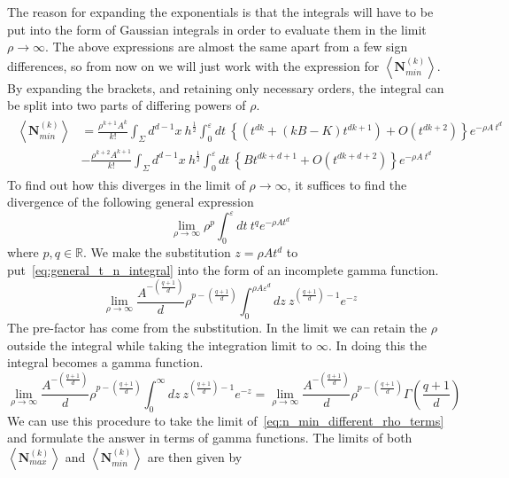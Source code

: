 \documentclass[12pt]{article}
\newcommand{\be}{\begin{equation}}
\newcommand{\ee}{\end{equation}}
\begin{document}
The reason for expanding the exponentials is that the integrals will have to be put into the form of Gaussian integrals in order to evaluate them in the limit $\rho\rightarrow\infty$. The above expressions are almost the same apart from a few sign differences, so from now on we will just work with the expression for $\left\langle \textbf{N}_{min}^{ (k)}\right\rangle$. By expanding the brackets, and retaining only necessary orders, the integral can be split into two parts of differing powers of $\rho$.
\begin{gather}\label{eq:n_min_different_rho_terms}
\begin{aligned}
\left\langle \textbf{N}_{min}^{ (k)}\right\rangle & = \frac{\rho^{k+1}A^k}{k!}\int_{\Sigma}d^{d-1}x\: h^{\frac{1}{2}}\int_{0}^{\varepsilon}dt\:
\left\lbrace \left ( t^{dk} + \left (kB-K \right)t^{dk+1}\right) + O\left (t^{dk+2}\right) \right\rbrace e^{-\rho A\: t^d}
 \\
 & - \frac{\rho^{k+2}A^{k+1}}{k!}\int_{\Sigma}d^{d-1}x\: h^{\frac{1}{2}}\int_{0}^{\varepsilon}dt\:
\left\lbrace Bt^{dk+d+1} + O\left (t^{dk+d+2}\right) \right\rbrace e^{-\rho A\: t^d}
\end{aligned}
\end{gather}
To find out how this diverges in the limit of $\rho \rightarrow\infty$, it suffices to find the divergence of the following general expression
\be\label{eq:general_t_n_integral}
\lim_{\rho\rightarrow\infty}\rho^{p}\int_{0}^{\varepsilon}dt\
t^{q}e^{-\rho At^{d}}
\ee
where $p,q \in \mathbb{R}$. We make the substitution $z=\rho At^{d}$ to put~\eqref{eq:general_t_n_integral} into the form of an incomplete gamma function.
\be\label{eq:incomplete_gamma_function}
\lim_{\rho\rightarrow\infty}\frac{A^{-\left (\frac{q+1}{d} \right)}}{d}\rho^{p-\left (\frac{q+1}{d} \right)}\int_{0}^{\rho A \varepsilon^d}dz\
z^{\left (\frac{q+1}{d} \right)-1}e^{-z}
\ee
The pre-factor has come from the substitution. In the limit we can retain the $\rho$ outside the integral while taking the integration limit to $\infty$. In doing this the integral becomes a gamma function.
\be\label{eq:gamma_function}
\lim_{\rho\rightarrow\infty}\frac{A^{-\left (\frac{q+1}{d} \right)}}{d}\rho^{p-\left (\frac{q+1}{d} \right)}\int_{0}^{\infty}dz\
z^{\left (\frac{q+1}{d} \right)-1}e^{-z}=\lim_{\rho\rightarrow\infty}
\frac{A^{-\left (\frac{q+1}{d} \right)}}{d}\rho^{p-\left (\frac{q+1}{d} \right)}\Gamma\left ( \frac{q+1}{d} \right)
\ee
We can use this procedure to take the limit of~\eqref{eq:n_min_different_rho_terms} and formulate the answer in terms of gamma functions. The limits of both $\left\langle \textbf{N}_{max}^{ (k)}\right\rangle$ and $\left\langle \textbf{N}_{min}^{ (k)}\right\rangle$ are then given by
\end{document}
